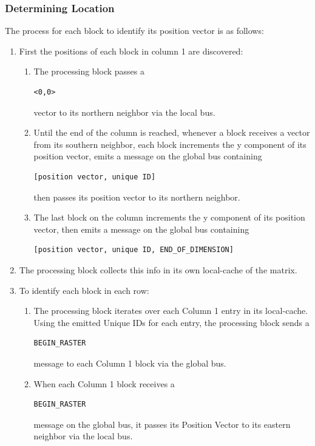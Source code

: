     \subsubsection{Determining Location}
      The process for each block to identify its position vector is as follows:
      \begin{enumerate}
        \item First the positions of each block in column 1 are discovered:
        \begin{enumerate}
          \item The processing block passes a \begin{verbatim}<0,0>\end{verbatim} vector to its northern neighbor via the local bus.
          \item Until the end of the column is reached, whenever a block receives a vector from its southern neighbor, each block increments the y component of its position vector, emits a message on the global bus containing \begin{verbatim}[position vector, unique ID]\end{verbatim}then passes its position vector to its northern neighbor.
          \item The last block on the column increments the y component of its position vector, then emits a message on the global bus containing \begin{verbatim}[position vector, unique ID, END_OF_DIMENSION]\end{verbatim}
        \end{enumerate}
      \item The processing block collects this info in its own local-cache of the matrix.
      \item To identify each block in each row:
        \begin{enumerate}
          \item The processing block iterates over each Column 1 entry in its local-cache. Using the emitted Unique IDs for each entry, the processing block sends a \begin{verbatim}BEGIN_RASTER\end{verbatim}message to each Column 1 block via the global bus.
          \item When each Column 1 block receives a \begin{verbatim}BEGIN_RASTER\end{verbatim}message on the global bus, it passes its Position Vector to its eastern neighbor via the local bus.

\end{enumerate}
\end{enumerate}

